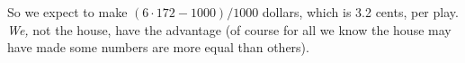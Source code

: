 
\tracingall
\noindent
So we expect to make $(6 \cdot 172 - 1000)/1000$ dollars,
which is 3.2 cents, per play.
{\em We,} not the house, have the advantage
(of course for all we know the house may have made
some numbers are more equal than others).
\showlists
{}
